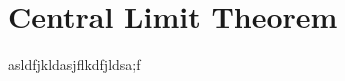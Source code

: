 \chapter{Central Limit Theorem}
\label{clt}


asldfjkldasjflkdfjldsa;f


\renewcommand\thefigure{\thechapter .\arabic{figure}}
